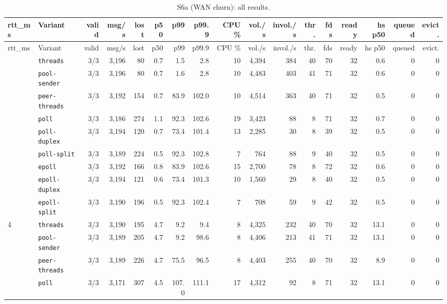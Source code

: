 \begin{longtable}{@{}llrrrrrrrrrrrrrrr@{}}
\caption{S6a (WAN churn): all results.}\label{tab:full-S6a}\\
\toprule
rtt\_ms & Variant & valid & msg/s & lost & p50 & p99 & p99.9 & CPU \% & vol./s & invol./s & thr. & fds & ready & hs p50 & queued & evict. \\
\midrule
\endfirsthead
\toprule
rtt\_ms & Variant & valid & msg/s & lost & p50 & p99 & p99.9 & CPU \% & vol./s & invol./s & thr. & fds & ready & hs p50 & queued & evict. \\
\midrule
\endhead
\bottomrule
\endfoot
0 & \texttt{threads} & 3/3 & 3{,}196 & 80 & 0.7 & 1.5 & 2.8 & 10 & 4{,}394 & 384 & 40 & 70 & 32 & 0.6 & 0 & 0 \\
 & \texttt{pool-sender} & 3/3 & 3{,}196 & 80 & 0.7 & 1.6 & 2.8 & 10 & 4{,}483 & 403 & 41 & 71 & 32 & 0.6 & 0 & 0 \\
 & \texttt{peer-threads} & 3/3 & 3{,}192 & 154 & 0.7 & 83.9 & 102.0 & 10 & 4{,}514 & 363 & 40 & 71 & 32 & 0.5 & 0 & 0 \\
 & \texttt{poll} & 3/3 & 3{,}186 & 274 & 1.1 & 92.3 & 102.6 & 19 & 3{,}423 & 88 & 8 & 71 & 32 & 0.7 & 0 & 0 \\
 & \texttt{poll-duplex} & 3/3 & 3{,}194 & 120 & 0.7 & 73.4 & 101.4 & 13 & 2{,}285 & 30 & 8 & 39 & 32 & 0.5 & 0 & 0 \\
 & \texttt{poll-split} & 3/3 & 3{,}189 & 224 & 0.5 & 92.3 & 102.8 & 7 & 764 & 88 & 9 & 40 & 32 & 0.5 & 0 & 0 \\
 & \texttt{epoll} & 3/3 & 3{,}192 & 166 & 0.8 & 83.9 & 102.6 & 15 & 2{,}700 & 78 & 8 & 72 & 32 & 0.6 & 0 & 0 \\
 & \texttt{epoll-duplex} & 3/3 & 3{,}194 & 121 & 0.6 & 73.4 & 101.3 & 10 & 1{,}560 & 29 & 8 & 40 & 32 & 0.5 & 0 & 0 \\
 & \texttt{epoll-split} & 3/3 & 3{,}190 & 196 & 0.5 & 92.3 & 102.4 & 7 & 708 & 59 & 9 & 42 & 32 & 0.5 & 0 & 0 \\
\midrule
4 & \texttt{threads} & 3/3 & 3{,}190 & 195 & 4.7 & 9.2 & 9.4 & 8 & 4{,}325 & 232 & 40 & 70 & 32 & 13.1 & 0 & 0 \\
 & \texttt{pool-sender} & 3/3 & 3{,}189 & 205 & 4.7 & 9.2 & 98.6 & 8 & 4{,}406 & 213 & 41 & 71 & 32 & 13.1 & 0 & 0 \\
 & \texttt{peer-threads} & 3/3 & 3{,}189 & 226 & 4.7 & 75.5 & 96.5 & 8 & 4{,}403 & 255 & 40 & 70 & 32 & 8.9 & 0 & 0 \\
 & \texttt{poll} & 3/3 & 3{,}171 & 307 & 4.5 & 107.0 & 111.1 & 17 & 4{,}312 & 92 & 8 & 71 & 32 & 13.1 & 0 & 0 \\

\end{longtable}
